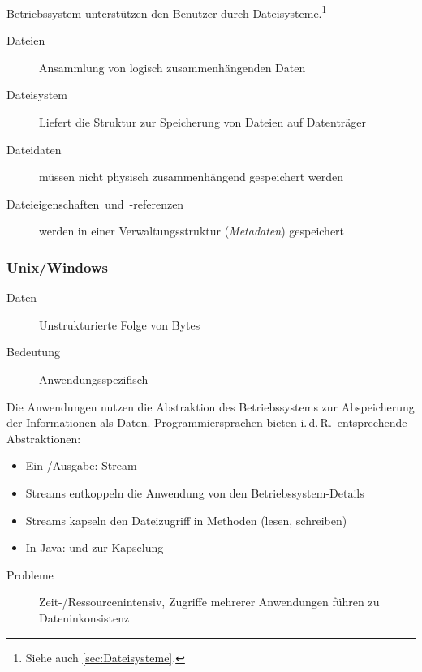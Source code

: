 Betriebssystem unterstützen den Benutzer durch Dateisysteme.\footnote{
	Siehe auch \vref{sec:Dateisysteme}.
}
\begin{description}
  \item [{Dateien}] 
	Ansammlung von logisch zusammenhängenden Daten
  \item [{Dateisystem}] 
	Liefert die Struktur zur Speicherung von Dateien auf Datenträger
  \item [{Dateidaten}] 
	müssen nicht physisch zusammenhängend gespeichert werden
  \item [{Dateieigenschaften~und~-referenzen}] 
	werden in einer Verwaltungsstruktur (\emph{Metadaten}) gespeichert
\end{description}

\subsubsection{Unix/Windows}
\begin{description}
  \item [{Daten}]     Unstrukturierte Folge von Bytes
  \item [{Bedeutung}] Anwendungsspezifisch
\end{description}

Die Anwendungen nutzen die Abstraktion des Betriebssystems zur Abspeicherung
der Informationen als Daten. Programmiersprachen bieten i.\,d.\,R.~entsprechende
Abstraktionen:
\begin{itemize}
  \item Ein-/Ausgabe: Stream
  \item Streams entkoppeln die Anwendung von den Betriebssystem-Details
  \item Streams kapseln den Dateizugriff in Methoden (lesen, schreiben)
  \item In Java:  und  zur Kapselung
\end{itemize}
\begin{description}
  \item [{Probleme}] Zeit-/Ressourcenintensiv, Zugriffe mehrerer Anwendungen führen zu Dateninkonsistenz
\end{description}

